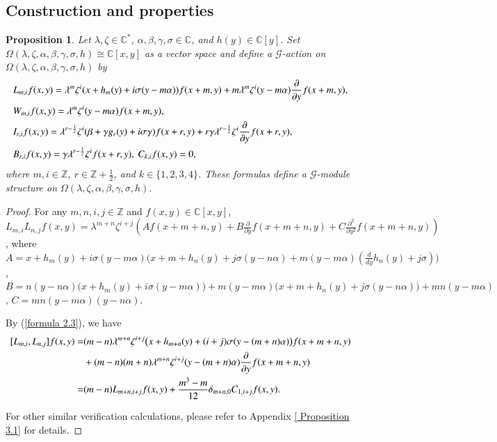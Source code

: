 \documentclass[12pt,reqno]{amsart}
\def\Z{\mathbb{Z}}
\numberwithin{equation}{section}
\newtheorem{prop}[theo]{Proposition}
\begin{document}
\subsection{Construction and properties}
\begin{prop}\label{prop 3.1}
  Let $\lambda,\zeta\in\mathbb C^*$, $\alpha,\beta,\gamma,\sigma\in\mathbb C$, and $h(y)\in\mathbb C[y]$. Set $\Omega(\lambda,\zeta,\alpha,\beta,\gamma,\sigma,h)\cong\mathbb C[x,y]$ as a vector space and define a 
 ${\mathcal{G}}$-action on $\Omega(\lambda, \zeta, \alpha,\beta,\gamma,\sigma,h)$ by
\begin{equation*}
\aligned
&L_{m,i} f(x,y)=\lambda^m\zeta^i(x+h_{m}(y)+i\sigma(y-m\alpha))f(x+m,y)+m\lambda^m\zeta^i(y-m\alpha)\frac{\partial }{\partial {y}}{f(x+m,y)},\\
&W_{m,i} f(x,y)=\lambda^m\zeta^i(y-m\alpha)f(x+m,y),\\
&I_{r,i} f(x,y)=\lambda^{r-\frac{1}{2}}\zeta^i(\beta+\gamma g_{r}(y)+i\sigma \gamma)f(x+r,y)+r\gamma\lambda^{r-\frac{1}{2}}\zeta^i\frac{\partial }{\partial {y}}{f(x+r,y)},\\ 
&B_{r,i} f(x,y)=\gamma\lambda^{r-\frac{1}{2}}\zeta^if(x+r,y),\ C_{k,i} f(x,y)=0,
\endaligned
\end{equation*}
where $m,i\in\Z$, $r\in\Z+\frac{1}{2}$, and $k\in\{1,2,3,4\}$. These formulas define a $\mathcal G$-module structure on $\Omega(\lambda,\zeta,\alpha,\beta,\gamma,\sigma,h)$.
\end{prop}
\begin{proof}
For any $m,n,i,j\in\mathbb{Z}$ and $f(x,y)\in\mathbb{C}[x,y]$, $L_{m,i}L_{n,j}f(x,y)=\lambda^{m+n}\zeta^{i+j}(Af(x+m+n,y)+B\frac{\partial }{\partial y}f(x+m+n,y)+C\frac{\partial^2}{\partial y^2}f(x+m+n,y))$, where $A=x+h_m(y)+i\sigma(y-m\alpha)\bigl(x+m+h_n(y)+j\sigma(y-n\alpha)+m(y-m\alpha)
\left(\frac{d}{dy}h_n(y)+j\sigma\right)\bigr)$, $B=
n(y-n\alpha)(x+h_m(y)+i\sigma(y-m\alpha)\bigr)+m(y-m\alpha)
\bigl(x+m+h_n(y)+j\sigma(y-n\alpha)\bigr)+mn(y-m\alpha)$, $C=mn(y-m\alpha)(y-n\alpha)$.

By (\ref{formula 2.3}), we have
\begin{equation*}
\aligned
\relax[L_{m,i},L_{n,j}]f(x,y)
=&(m-n)\lambda^{m+n}\zeta^{i+j}
\bigl(x+h_{m+n}(y)+(i+j)\sigma(y-(m+n)\alpha)\bigr)
f(x+m+n,y)\\
&
+(m-n)(m+n)\lambda^{m+n}\zeta^{i+j}
(y-(m+n)\alpha)
\frac{\partial }{\partial y}f(x+m+n,y)\\
=&(m-n)L_{m+n,i+j}f(x,y)+\frac{m^3-m}{12}\delta_{m+n,0}C_{1,i+j}f(x,y).
\endaligned
\end{equation*}

For other similar verification calculations, please refer to Appendix \ref{ Proposition 3.1} for details. 
\end{proof}
\end{document}

